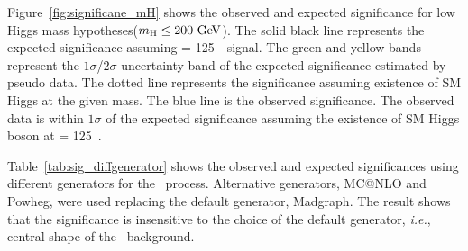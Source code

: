 Figure~\ref{fig:significane_mH} shows the observed and expected 
significance for low Higgs mass hypotheses($m_{\mathrm{H}}\le200~\mathrm{Ge\kern -0.1em V}$). 
The solid black line represents the expected significance assuming 
\mHi = 125~\GeV\ signal. 
The green and yellow bands represent the $1\sigma$/$2\sigma$ uncertainty 
band of the expected significance estimated by pseudo data. 
The dotted line represents the significance 
assuming existence of SM Higgs at the given mass. 
The blue line is the observed significance. 
The observed data is within $1\sigma$ of the expected significance 
assuming the existence of SM Higgs boson at \mHi = 125~\GeV.

Table~\ref{tab:sig_diffgenerator} shows the observed and expected significances 
using different generators for the \qqww\ process. Alternative generators, 
MC@NLO and Powheg, were used replacing the default generator, Madgraph.
The result shows that the significance is insensitive to the choice 
of the default generator, \textit{i.e.}, central shape of the \qqww\ background.  


